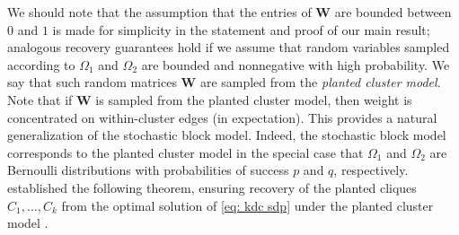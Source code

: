 \documentclass[twoside,11pt]{article}
\newcommand{\bs}{\boldsymbol}
\newcommand{\W}{\bs {W}}
\newcommand{\0}{\bs{0}}
\newcommand{\kdc}{\(k\)-disjoint-clique }
\begin{document}
{We should note that the assumption that the entries of \(\W\) are bounded between \(0\) and
\(1\) is made for simplicity in the statement and proof of our main result;
analogous recovery guarantees hold if we assume that random variables
sampled according to \(\Omega_1\) and \(\Omega_2\)
are bounded and nonnegative with high probability.
We say that such random matrices \(\W\) are sampled from the \emph{planted cluster model}.
Note that if \(\W\) is sampled from the planted cluster model, then weight is concentrated
on within-cluster edges (in expectation).
This provides a natural generalization of the stochastic block model.
Indeed, the stochastic block model corresponds to the planted cluster model
in the special case that \(\Omega_1\) and \(\Omega_2\) are Bernoulli distributions with probabilities of
success \(p\) and \(q\), respectively.
\cite{ames2014guaranteed} established the following theorem, ensuring recovery of the planted cliques
\(C_1, \dots, C_k\) from the optimal solution of \eqref{eq: kdc sdp} under the planted cluster model \citep[see][Theorem 2.1]{ames2014guaranteed}.

}
\end{document}
